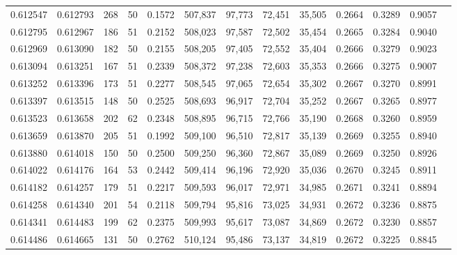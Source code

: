 \begin{tabular}{rrrrrrrrrrrrr}
0.612547 & 0.612793 &   268 &  50 &                                     0.1572 & 507,837 &  97,773 &  72,451 &  35,505 & 0.2664 & 0.3289 & 0.9057 \\
0.612795 & 0.612967 &   186 &  51 &                                     0.2152 & 508,023 &  97,587 &  72,502 &  35,454 & 0.2665 & 0.3284 & 0.9040 \\
0.612969 & 0.613090 &   182 &  50 &                                     0.2155 & 508,205 &  97,405 &  72,552 &  35,404 & 0.2666 & 0.3279 & 0.9023 \\
0.613094 & 0.613251 &   167 &  51 &                                     0.2339 & 508,372 &  97,238 &  72,603 &  35,353 & 0.2666 & 0.3275 & 0.9007 \\
0.613252 & 0.613396 &   173 &  51 &                                     0.2277 & 508,545 &  97,065 &  72,654 &  35,302 & 0.2667 & 0.3270 & 0.8991 \\
0.613397 & 0.613515 &   148 &  50 &                                     0.2525 & 508,693 &  96,917 &  72,704 &  35,252 & 0.2667 & 0.3265 & 0.8977 \\
0.613523 & 0.613658 &   202 &  62 &                                     0.2348 & 508,895 &  96,715 &  72,766 &  35,190 & 0.2668 & 0.3260 & 0.8959 \\
0.613659 & 0.613870 &   205 &  51 &                                     0.1992 & 509,100 &  96,510 &  72,817 &  35,139 & 0.2669 & 0.3255 & 0.8940 \\
0.613880 & 0.614018 &   150 &  50 &                                     0.2500 & 509,250 &  96,360 &  72,867 &  35,089 & 0.2669 & 0.3250 & 0.8926 \\
0.614022 & 0.614176 &   164 &  53 &                                     0.2442 & 509,414 &  96,196 &  72,920 &  35,036 & 0.2670 & 0.3245 & 0.8911 \\
0.614182 & 0.614257 &   179 &  51 &                                     0.2217 & 509,593 &  96,017 &  72,971 &  34,985 & 0.2671 & 0.3241 & 0.8894 \\
0.614258 & 0.614340 &   201 &  54 &                                     0.2118 & 509,794 &  95,816 &  73,025 &  34,931 & 0.2672 & 0.3236 & 0.8875 \\
0.614341 & 0.614483 &   199 &  62 &                                     0.2375 & 509,993 &  95,617 &  73,087 &  34,869 & 0.2672 & 0.3230 & 0.8857 \\
0.614486 & 0.614665 &   131 &  50 &                                     0.2762 & 510,124 &  95,486 &  73,137 &  34,819 & 0.2672 & 0.3225 & 0.8845 \\

\end{tabular}
